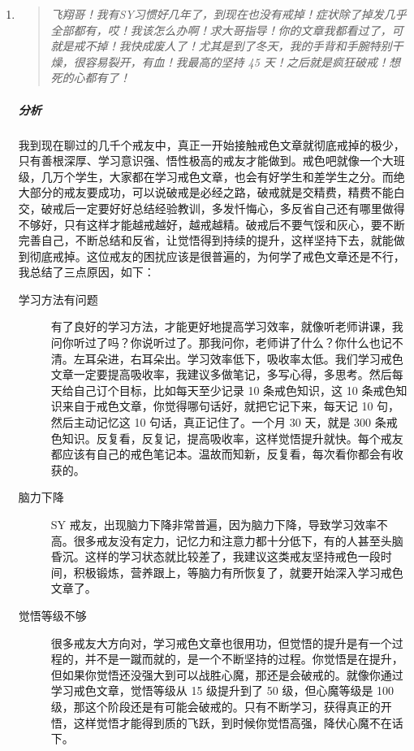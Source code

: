 \documentclass[fontset=founder]{ctexart}
\begin{document}
\begin{enumerate}
    \item \begin{quote}\it
        飞翔哥！我有SY习惯好几年了，到现在也没有戒掉！症状除了掉发几乎全部都有，哎！我该怎么办啊！求大哥指导！你的文章我都看过了，可就是戒不掉！我快成废人了！尤其是到了冬天，我的手背和手腕特别干燥，很容易裂开，有血！我最高的坚持 45 天！之后就是疯狂破戒！想死的心都有了！
    \end{quote}
    \subparagraph{分析} 我到现在聊过的几千个戒友中，真正一开始接触戒色文章就彻底戒掉的极少，只有善根深厚、学习意识强、悟性极高的戒友才能做到。戒色吧就像一个大班级，几万个学生，大家都在学习戒色文章，也会有好学生和差学生之分。而绝大部分的戒友要成功，可以说破戒是必经之路，破戒就是交精费，精费不能白交，破戒后一定要好好总结经验教训，多发忏悔心，多反省自己还有哪里做得不够好，只有这样才能越戒越好，越戒越精。破戒后不要气馁和灰心，要不断完善自己，不断总结和反省，让觉悟得到持续的提升，这样坚持下去，就能做到彻底戒掉。这位戒友的困扰应该是很普遍的，为何学了戒色文章还是不行，我总结了三点原因，如下：\begin{description}
        \item[学习方法有问题] 有了良好的学习方法，才能更好地提高学习效率，就像听老师讲课，我问你听过了吗？你说听过了。那我问你，老师讲了什么？你什么也记不清。左耳朵进，右耳朵出。学习效率低下，吸收率太低。我们学习戒色文章一定要提高吸收率，我建议多做笔记，多写心得，多思考。然后每天给自己订个目标，比如每天至少记录 10 条戒色知识，这 10 条戒色知识来自于戒色文章，你觉得哪句话好，就把它记下来，每天记 10 句，然后主动记忆这 10 句话，真正记住了。一个月 30 天，就是 300 条戒色知识。反复看，反复记，提高吸收率，这样觉悟提升就快。每个戒友都应该有自己的戒色笔记本。温故而知新，反复看，每次看你都会有收获的。
        \item[脑力下降] SY 戒友，出现脑力下降非常普遍，因为脑力下降，导致学习效率不高。很多戒友没有定力，记忆力和注意力都十分低下，有的人甚至头脑昏沉。这样的学习状态就比较差了，我建议这类戒友坚持戒色一段时间，积极锻炼，营养跟上，等脑力有所恢复了，就要开始深入学习戒色文章了。
        \item[觉悟等级不够] 很多戒友大方向对，学习戒色文章也很用功，但觉悟的提升是有一个过程的，并不是一蹴而就的，是一个不断坚持的过程。你觉悟是在提升，但如果你觉悟还没强大到可以战胜心魔，那还是会破戒的。就像你通过学习戒色文章，觉悟等级从 15 级提升到了 50 级，但心魔等级是 100 级，那这个阶段还是有可能会破戒的。只有不断学习，获得真正的开悟，这样觉悟才能得到质的飞跃，到时候你觉悟高强，降伏心魔不在话下。
    \end{description}

\end{enumerate}
\end{document}
